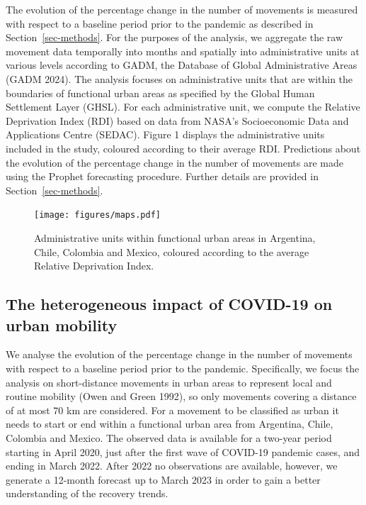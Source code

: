 \documentclass[
  11pt,
]{article}
\begin{document}
The evolution of the percentage change in the number of movements is
measured with respect to a baseline period prior to the pandemic as
described in Section~\ref{sec-methods}. For the purposes of the
analysis, we aggregate the raw movement data temporally into months and
spatially into administrative units at various levels according to GADM,
the Database of Global Administrative Areas (GADM 2024). The analysis
focuses on administrative units that are within the boundaries of
functional urban areas as specified by the Global Human Settlement Layer
(GHSL). For each administrative unit, we compute the Relative
Deprivation Index (RDI) based on data from NASA's Socioeconomic Data and
Applications Centre (SEDAC). Figure 1 displays the administrative units
included in the study, coloured according to their average RDI.
Predictions about the evolution of the percentage change in the number
of movements are made using the Prophet forecasting procedure. Further
details are provided in Section~\ref{sec-methods}.

\begin{figure}

{\centering \texttt{[image: figures/maps.pdf]}

}

\caption{Administrative units within functional urban areas in
Argentina, Chile, Colombia and Mexico, coloured according to the average
Relative Deprivation Index.}

\end{figure}

\hypertarget{the-heterogeneous-impact-of-covid-19-on-urban-mobility}{%
\subsection{The heterogeneous impact of COVID-19 on urban
mobility}\label{the-heterogeneous-impact-of-covid-19-on-urban-mobility}}

We analyse the evolution of the percentage change in the number of
movements with respect to a baseline period prior to the pandemic.
Specifically, we focus the analysis on short-distance movements in urban
areas to represent local and routine mobility (Owen and Green 1992), so
only movements covering a distance of at most 70 km are considered. For
a movement to be classified as urban it needs to start or end within a
functional urban area from Argentina, Chile, Colombia and Mexico. The
observed data is available for a two-year period starting in April 2020,
just after the first wave of COVID-19 pandemic cases, and ending in
March 2022. After 2022 no observations are available, however, we
generate a 12-month forecast up to March 2023 in order to gain a better
understanding of the recovery trends.
\end{document}
